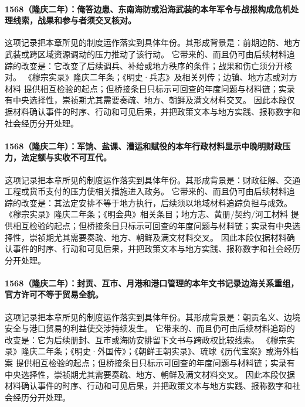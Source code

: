 \paragraph{1568（隆庆二年）：俺答边患、东南海防或沿海武装的本年军令与战报构成危机处理线索，战果和参与者须交叉核对。} 这项记录把本章所见的制度运作落实到具体年份。其形成背景是：前期边防、地方武装或跨区域资源调动的压力推动了该行动。 它带来的、而且仍可由后续材料追踪的改变是：它改变了后续调兵、补给或地方秩序的条件；战果和伤亡须分开核对。 《穆宗实录》隆庆二年条；《明史·兵志》及相关列传；边镇、地方志或对方材料 提供相互检验的起点；但桥接条目只标示可回查的年度问题与材料链；实录有中央选择性，崇祯期尤其需要奏疏、地方、朝鲜及满文材料交叉。 因此本段仅据材料确认事件的时序、行动和可见后果，并把政策文本与地方实践、报称数字和社会经历分开处理。

\paragraph{1568（隆庆二年）：军饷、盐课、漕运和赋役的本年行政材料显示中晚明财政压力，法定额与实收不可互代。} 这项记录把本章所见的制度运作落实到具体年份。其形成背景是：财政征解、交通工程或货币支付的压力使相关措施进入政务。 它带来的、而且仍可由后续材料追踪的改变是：其法定安排不等于地方执行，后续须以地域材料追踪负担与成效。 《穆宗实录》隆庆二年条；《明会典》相关条目；地方志、黄册/契约/河工材料 提供相互检验的起点；但桥接条目只标示可回查的年度问题与材料链；实录有中央选择性，崇祯期尤其需要奏疏、地方、朝鲜及满文材料交叉。 因此本段仅据材料确认事件的时序、行动和可见后果，并把政策文本与地方实践、报称数字和社会经历分开处理。

\paragraph{1568（隆庆二年）：封贡、互市、月港和港口管理的本年文书记录边海关系重组，官方许可不等于贸易全貌。} 这项记录把本章所见的制度运作落实到具体年份。其形成背景是：朝贡名义、边境安全与港口贸易的利益使交涉持续发生。 它带来的、而且仍可由后续材料追踪的改变是：它为后续册封、互市或海防安排留下文书与跨政权比较线索。 《穆宗实录》隆庆二年条；《明史·外国传》；《朝鲜王朝实录》、琉球《历代宝案》或海外档案 提供相互检验的起点；但桥接条目只标示可回查的年度问题与材料链；实录有中央选择性，崇祯期尤其需要奏疏、地方、朝鲜及满文材料交叉。 因此本段仅据材料确认事件的时序、行动和可见后果，并把政策文本与地方实践、报称数字和社会经历分开处理。

